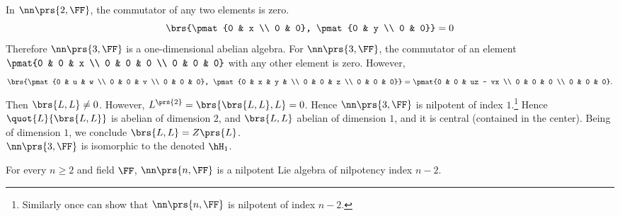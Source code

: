\documentclass[10pt,a4paper,twoside,openany,hidelinks]{book}
\begin{document}
\begin{example}
In $\nn\prs{2,\FF}$, the commutator of any two elements is zero.
\[\brs{\pmat{0 & x \\ 0 & 0}, \pmat{0 & y \\ 0 & 0}} = 0\]
Therefore $\nn\prs{3,\FF}$ is a one-dimensional abelian algebra.
For $\nn\prs{3,\FF}$, the commutator of an element $\pmat{0 & 0 & x \\ 0 & 0 & 0 \\ 0 & 0 & 0}$ with any other element is zero. However,
\[\brs{\pmat{0 & u & w \\ 0 & 0 & v \\ 0 & 0 & 0}, \pmat{0 & x & y & \\ 0 & 0 & z \\ 0 & 0 & 0}} = \pmat{0 & 0 & uz - vx \\ 0 & 0 & 0 \\ 0 & 0 & 0}\text{.}\]
Then $\brs{L,L} \neq 0$. However, $L^{\prs{2}} = \brs{\brs{L,L},L} = 0$. Hence $\nn\prs{3,\FF}$ is nilpotent of index $1$.\footnote{Similarly once can show that $\nn\prs{n,\FF}$ is nilpotent of index $n-2$.}
Hence $\quot{L}{\brs{L,L}}$ is abelian of dimension $2$, and $\brs{L,L}$ abelian of dimension $1$, and it is central (contained in the center). Being of dimension $1$, we conclude $\brs{L,L} = Z\prs{L}$.\\
$\nn\prs{3,\FF}$ is isomorphic to the  denoted $\hH_1$.
\end{example}
\begin{proposition}
For every $n \geq 2$ and field $\FF$, $\nn\prs{n,\FF}$ is a nilpotent Lie algebra of nilpotency index $n-2$.
\end{proposition}
\end{document}
